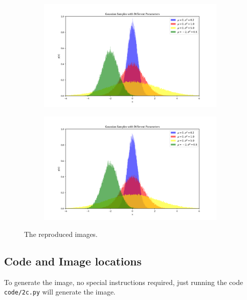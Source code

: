 \begin{figure}[H]
    \centering
    \begin{subfigure}{0.8\textwidth}
        \centering
        \includegraphics[width=\textwidth]{assets/images/a2c1.png}
        \caption{}
        \label{fig_a2c1}
    \end{subfigure}
    \begin{subfigure}{0.8\textwidth}
        \centering
        \includegraphics[width=\textwidth]{assets/images/a2c2.png}
        \caption{}
        \label{fig_a2c2}
    \end{subfigure}
    \caption{The reproduced images.}
\end{figure}

\subsection*{Code and Image locations}

To generate the image, no special instructions required, just running the code
\texttt{code/2c.py} will generate the image.

